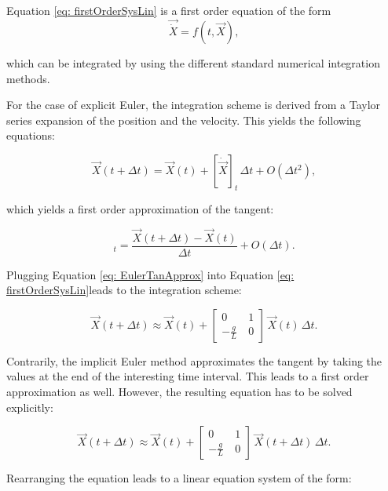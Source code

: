 \documentclass[12pt,bibstyle=none,pagenumberinfooter]{ifmdocument}
\begin{document}
Equation \ref{eq: firstOrderSysLin} is a first order equation of the form
\begin{equation}
    \Vec{\Dot{X}} = f(t,\Vec{X}),
    \label{eq: GeneralIntForm}
\end{equation}

which can be integrated by using the different standard numerical integration methods.

For the case of explicit Euler, the integration scheme is derived from a Taylor series expansion of the position and the velocity. This yields the following equations:

\begin{equation}
    \Vec{X}(t+\Delta t) = \Vec{X}(t) + [\Dot{\Vec{X}}]_t\,\Delta t + {O(\Delta t^2)},
\end{equation}

which yields a first order approximation of the tangent:

\begin{equation}
    [\Vec{\Dot{X}}]_t = \frac{\Vec{X}(t+\Delta t)-\Vec{X}(t)}{\Delta t} + O\left(\Delta t\right).
    \label{eq: EulerTanApprox}
\end{equation}

Plugging Equation \ref{eq: EulerTanApprox} into Equation \ref{eq: firstOrderSysLin}leads to the integration scheme:

\begin{equation}
    \Vec{X}(t+\Delta t) \approx \Vec{X}(t) + \begin{bmatrix}
        0 & 1 \\ -\frac{g}{L}\ & 0 
        \end{bmatrix} \, \Vec{X}(t) \, \Delta t.
\end{equation}

Contrarily, the implicit Euler method approximates the tangent by taking the values at the end of the interesting time interval. This leads to a first order approximation as well. However, the resulting equation has to be solved explicitly:

\begin{equation}
    \Vec{X}(t+\Delta t) \approx \Vec{X}(t) + \begin{bmatrix}
        0 & 1 \\ -\frac{g}{L}\ & 0 
        \end{bmatrix} \, \Vec{X}(t+\Delta t) \, \Delta t.
\end{equation}

Rearranging the equation leads to a linear equation system of the form:
\end{document}
